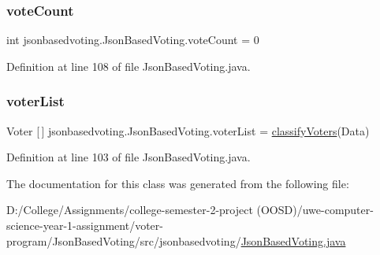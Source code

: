 \mbox{\label{classjsonbasedvoting_1_1_json_based_voting_a94c8b3fcebf88d5a739c9bc869160087}} 
\subsubsection{\texorpdfstring{voteCount}{voteCount}}
{\footnotesize\ttfamily int jsonbasedvoting.\+Json\+Based\+Voting.\+vote\+Count = 0\hspace{0.3cm}{\ttfamily [static]}}



Definition at line 108 of file Json\+Based\+Voting.\+java.

\mbox{\label{classjsonbasedvoting_1_1_json_based_voting_a50b66e1d5c92322631fc26d0d607172e}} 
\subsubsection{\texorpdfstring{voterList}{voterList}}
{\footnotesize\ttfamily Voter \mbox{[}$\,$\mbox{]} jsonbasedvoting.\+Json\+Based\+Voting.\+voter\+List = \mbox{\hyperlink{classjsonbasedvoting_1_1_json_based_voting_a6f76956192c5ec8d7704c20bcc967d91}{classify\+Voters}}(Data)\hspace{0.3cm}{\ttfamily [static]}}



Definition at line 103 of file Json\+Based\+Voting.\+java.



The documentation for this class was generated from the following file\+:\begin{DoxyCompactItemize}
\item 
D\+:/\+College/\+Assignments/college-\/semester-\/2-\/project (\+O\+O\+S\+D)/uwe-\/computer-\/science-\/year-\/1-\/assignment/voter-\/program/\+Json\+Based\+Voting/src/jsonbasedvoting/\mbox{\hyperlink{_json_based_voting_8java}{Json\+Based\+Voting.\+java}}\end{DoxyCompactItemize}
